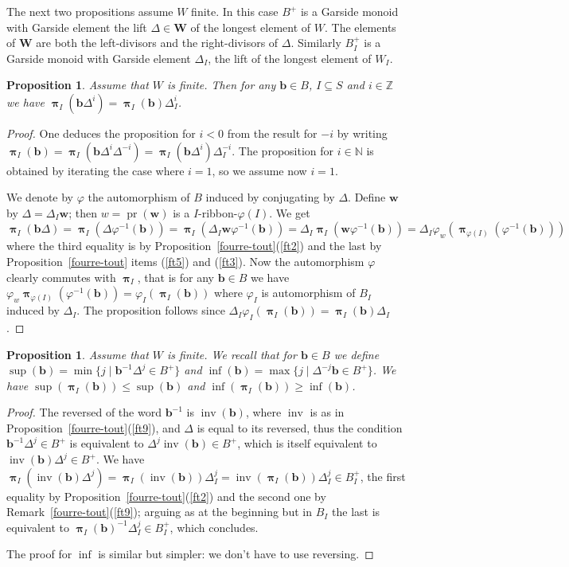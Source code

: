 \documentclass{amsart}
\numberwithin{equation}{section}
\newtheorem{proposition}[equation]{Proposition}
\newcommand\inv{^{-1}}
\newcommand\bb{{\mathbf b}}
\newcommand\bw{{\mathbf w}}
\newcommand\bW{{\mathbf W}}
\newcommand\BN{{\mathbb N}}
\newcommand\BZ{{\mathbb Z}}
\DeclareMathOperator\inverse{inv}
\DeclareMathOperator\pr{pr}
\DeclareMathOperator\bpi{\boldsymbol\pi}
\begin{document}
The  next two propositions assume $W$ finite.  In this case $B^+$ is a Garside
monoid with Garside element the lift $\Delta\in\bW$ of the longest element of
$W$.  The elements of $\bW$ are  both the left-divisors and the right-divisors
of $\Delta$. Similarly $B_I^+$ is a Garside monoid with Garside element $\Delta_I$, the lift
of the longest element of $W_I$.
\begin{proposition} \label{pi(deltab)} Assume that $W$ is finite. 
Then for any $\bb\in B$, $I\subseteq S$ and $i\in\BZ$ we have
$\bpi_I(\bb\Delta^i)=\bpi_I(\bb)\Delta_I^i$.
\end{proposition}
\begin{proof}
One deduces the proposition for $i<0$ from the result for $-i$ by writing 
$\bpi_I(\bb)=\bpi_I(\bb\Delta^i\Delta^{-i})=\bpi_I(\bb\Delta^i)\Delta_I^{-i}$.
The proposition for $i\in\BN$
is obtained by iterating the case where $i=1$, so we assume now $i=1$.

We  denote by $\varphi$  the automorphism of  $B$ induced by conjugating by
$\Delta$.  Define $\bw$  by $\Delta=\Delta_I\bw$;  then $w=\pr(\bw)$  is a
 $I$-ribbon-$\varphi(I)$.
We  get $\bpi_I(\bb\Delta)=\bpi_I(\Delta\varphi\inv(\bb))=
\bpi_I(\Delta_I\bw\varphi\inv(\bb))=
\Delta_I\bpi_I(\bw\varphi\inv(\bb))=
\Delta_I\varphi_w(\bpi_{\varphi(I)}(\varphi\inv(\bb)))$ where the third
equality is by Proposition~\ref{fourre-tout}(\ref{ft2}) and the last
by Proposition~\ref{fourre-tout} items (\ref{ft5}) and (\ref{ft3}).  
Now the automorphism
$\varphi$ clearly commutes with $\bpi_I$, that is for any $\bb\in B$ we have
$\varphi_w\bpi_{\varphi(I)}(\varphi\inv(\bb))=\varphi_I(\bpi_I(\bb))$  where
$\varphi_I$ is automorphism of $B_I$ induced by $\Delta_I$. The proposition
follows since $\Delta_I\varphi_I(\bpi_I(\bb))= \bpi_I(\bb)\Delta_I$.
\end{proof}
\begin{proposition} Assume that $W$ is finite. We recall that for
$\bb\in B$ we define $\sup(\bb)=\min\{j\mid \bb\inv\Delta^j\in B^+\}$ and 
$\inf(\bb)=\max\{j\mid \Delta^{-j}\bb\in B^+\}$. We
have $\sup(\bpi_I(\bb))\le\sup(\bb)$ and $\inf(\bpi_I(\bb))\ge\inf(\bb)$.
\end{proposition}
\begin{proof}
The reversed of the word $\bb\inv$ is $\inverse(\bb)$, where $\inverse$ is as
in Proposition~\ref{fourre-tout}(\ref{ft9}), and $\Delta$ is equal to its reversed, thus
the condition $\bb\inv\Delta^j\in B^+$ is equivalent
to $\Delta^j\inverse(\bb)\in B^+$, which is itself equivalent to
$\inverse(\bb)\Delta^j\in B^+$.
We have $\bpi_I( \inverse(\bb)\Delta^j)=\bpi_I(\inverse(\bb))\Delta_I^j=
\inverse(\bpi_I(\bb))\Delta_I^j\in B_I^+$,
the first equality by Proposition~\ref{fourre-tout}(\ref{ft2}) and the second
one by Remark~\ref{fourre-tout}(\ref{ft9}); 
arguing as at the beginning but in $B_I$  the last is equivalent
to $\bpi_I(\bb)\inv\Delta_I^j\in B_I^+$, which concludes.

The proof for $\inf$ is similar but simpler: we don't have to use reversing.
\end{proof}
\end{document}
